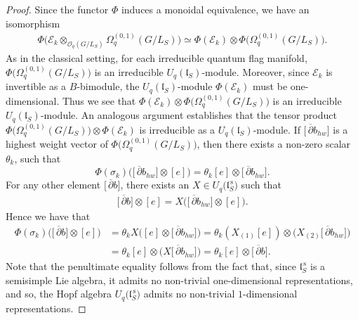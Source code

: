 \documentclass[pdftex]{sigma}
\numberwithin{equation}{section}
\newcommand\adel{\overline{\partial}}
\begin{document}
\begin{proof}
Since the functor $\Phi$ induces a monoidal equivalence, we have an isomorphism
\begin{gather*}%
\Phi\big(\mathcal{E}_k \otimes_{\mathcal{O}_q(G/L_S)} \Omega^{(0,1)}_q(G/L_S)\big) \simeq \Phi(\mathcal{E}_k) \otimes \Phi\big(\Omega^{(0,1)}_q(G/L_S)\big).
\end{gather*}
As in the classical setting, for each irreducible quantum flag manifold, $\Phi\big(\Omega^{(0,1)}_q(G/L_S)\big)$ is an irreducible $U_q(\mathfrak{l}_S)$-module. Moreover, since $\mathcal{E}_k$ is invertible as a $B$-bimodule, the $U_q(\mathfrak{l}_S)$-module $\Phi(\mathcal{E}_k)$ must be one-dimensional. Thus we see that $\Phi(\mathcal{E}_k) \otimes \Phi\big(\Omega^{(0,1)}_q(G/L_S)\big)$ is an irreducible $U_q(\mathfrak{l}_S)$-module. An analogous argument establishes that the tensor product $\Phi\big(\Omega^{(0,1)}_q(G/L_S)\big) \otimes \Phi(\mathcal{E}_k)$ is irreducible as a $U_q(\mathfrak{l}_S)$-module.
If $\big[\,\adel b_{hw}\big]$ is a highest weight vector of $\Phi\big(\Omega^{(0,1)}_q(G/L_S)\big)$, then there exists a non-zero scalar~$\theta_k$, such that
\[
\Phi(\sigma_k)\big(\big[\,\adel b_{hw}\big] \otimes [e]\big) = \theta_k [e] \otimes \big[\,\adel b_{hw}\big].
\]
For any other element $\big[\,\adel b\big]$, there exists an $X\in U_q\big(\mathfrak{l}_S^{\,\mathrm{s}}\big)$ such that
\begin{gather*}
 \big[\,\adel b\big] \otimes [e]=X\big(\big[\,\adel b_{hw}\big] \otimes [e]\big).
\end{gather*}
Hence we have that
\begin{align*}
 \Phi(\sigma_k)\big(\big[\,\adel b\big] \otimes [e]\big) &= \theta_k X\big([e] \otimes \big[\,\adel b_{hw}\big]\big)
= \theta_k (X_{(1)}[e]) \otimes \big(X_{(2)}\big[\,\adel b_{hw}\big]\big)\\
&= \theta_k [e] \otimes \big(X\big[\,\adel b_{hw}\big]\big)
= \theta_k [e] \otimes \big[\,\adel b\big].
\end{align*}
Note that the penultimate equality follows from the fact that, since $\mathfrak{l}_S^{\,\mathrm{s}}$ is a semisimple Lie algebra, it admits no non-trivial one-dimensional representations, and so, the Hopf algebra $U_q\big(\mathfrak{l}_S^{\,\mathrm{s}}\big)$ admits no non-trivial $1$-dimensional representations.


\end{proof}
\end{document}
